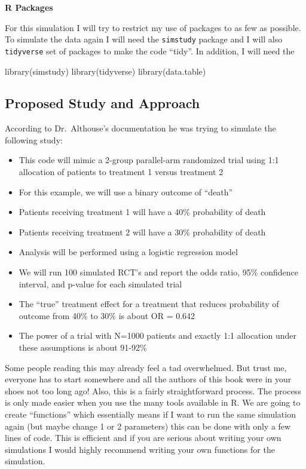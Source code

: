 \documentclass[
]{book}
\newenvironment{Shaded}{\begin{snugshade}}{\end{snugshade}}
\newcommand{\FunctionTok}[1]{\textcolor[rgb]{0.00,0.00,0.00}{#1}}
\newcommand{\NormalTok}[1]{#1}
\providecommand{\tightlist}{%
  \setlength{\itemsep}{0pt}\setlength{\parskip}{0pt}}
\begin{document}
\textbf{R Packages}

For this simulation I will try to restrict my use of packages to as few as possible. To simulate the data again I will need the \texttt{simstudy} package and I will also \texttt{tidyverse} set of packages to make the code ``tidy''. In addition, I will need the

\begin{Shaded}
\begin{Highlighting}[]
\FunctionTok{library}\NormalTok{(simstudy)}
\FunctionTok{library}\NormalTok{(tidyverse)}
\FunctionTok{library}\NormalTok{(data.table)}
\end{Highlighting}
\end{Shaded}

\hypertarget{proposed-study-and-approach}{%
\subsection{Proposed Study and Approach}\label{proposed-study-and-approach}}

According to Dr.~Althouse's documentation he was trying to simulate the following study:

\begin{itemize}
\tightlist
\item
  This code will mimic a 2-group parallel-arm randomized trial using 1:1 allocation of patients to treatment 1 versus treatment 2
\item
  For this example, we will use a binary outcome of ``death''
\item
  Patients receiving treatment 1 will have a 40\% probability of death
\item
  Patients receiving treatment 2 will have a 30\% probability of death
\item
  Analysis will be performed using a logistic regression model
\item
  We will run 100 simulated RCT's and report the odds ratio, 95\% confidence interval, and p-value for each simulated trial
\item
  The ``true'' treatment effect for a treatment that reduces probability of outcome from 40\% to 30\% is about OR = 0.642
\item
  The power of a trial with N=1000 patients and exactly 1:1 allocation under these assumptions is about 91-92\%
\end{itemize}

Some people reading this may already feel a tad overwhelmed. But trust me, everyone has to start somewhere and all the authors of this book were in your shoes not too long ago! Also, this is a fairly straightforward process. The process is only made easier when you use the many tools available in R. We are going to create ``functions'' which essentially means if I want to run the same simulation again (but maybe change 1 or 2 parameters) this can be done with only a few lines of code. This is efficient and if you are serious about writing your own simulations I would highly recommend writing your own functions for the simulation.
\end{document}
